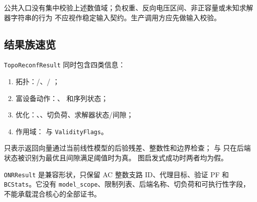 公共入口没有集中校验上述数值域；负权重、反向电压区间、非正容量或未知求解器字符串的行为
不应视作稳定输入契约。生产调用方应先做输入校验。

\subsection{结果族速览}

\texttt{TopoReconfResult} 同时包含四类信息：
\begin{enumerate}
  \item 拓扑：/、/
        ；
  \item 富设备动作：、 和序列状态；
  \item 优化：、、切负荷、求解器状态/间隙；
  \item 作用域： 与 \texttt{ValidityFlags}。
\end{enumerate}
 只表示返回向量通过当前线性模型的后验残差、整数性和边界检查；
 与  只在后端状态被识别为最优且间隙满足阈值时为真。
图启发式成功时两者均为假。

\texttt{ONRResult} 是兼容形状，只保留 AC 整数支路 ID、代理目标、验证 PF 和
\texttt{BCStats}。它没有 \texttt{model\_scope}、限制列表、后端名称、切负荷和可执行性字段，
不能承载混合核心的全部证书。
